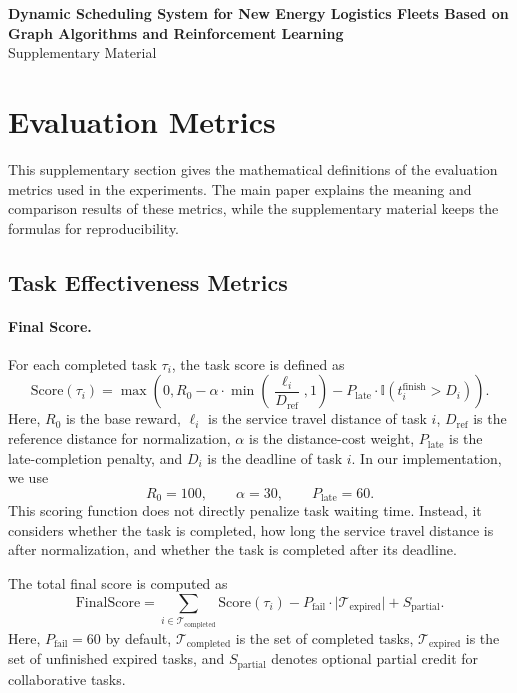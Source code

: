 \clearpage
\onecolumn
\setcounter{page}{1}
\begin{center}
{\Large\bfseries Dynamic Scheduling System for New Energy Logistics Fleets Based on Graph Algorithms and Reinforcement Learning\\[0.5em]}
{\large Supplementary Material}
\end{center}
\vspace{1em}

\section{Evaluation Metrics}
\label{sec:supp_eval_metrics}

This supplementary section gives the mathematical definitions of the evaluation metrics used in the experiments. The main paper explains the meaning and comparison results of these metrics, while the supplementary material keeps the formulas for reproducibility.

\subsection{Task Effectiveness Metrics}

\paragraph{Final Score.}
For each completed task \(\tau_i\), the task score is defined as
\[
\mathrm{Score}(\tau_i)=
\max
\left(
0,
R_0
-
\alpha \cdot
\min
\left(
\frac{\ell_i}{D_{\mathrm{ref}}},
1
\right)
-
P_{\mathrm{late}}\cdot
\mathbb{I}\left(t_i^{\mathrm{finish}}>D_i\right)
\right).
\]
Here, \(R_0\) is the base reward, \(\ell_i\) is the service travel distance of task \(i\), \(D_{\mathrm{ref}}\) is the reference distance for normalization, \(\alpha\) is the distance-cost weight, \(P_{\mathrm{late}}\) is the late-completion penalty, and \(D_i\) is the deadline of task \(i\). In our implementation, we use
\[
R_0=100,
\qquad
\alpha=30,
\qquad
P_{\mathrm{late}}=60.
\]
This scoring function does not directly penalize task waiting time. Instead, it considers whether the task is completed, how long the service travel distance is after normalization, and whether the task is completed after its deadline.

The total final score is computed as
\[
\mathrm{FinalScore}=
\sum_{i\in\mathcal{T}_{\mathrm{completed}}}
\mathrm{Score}(\tau_i)
-
P_{\mathrm{fail}}\cdot
\lvert\mathcal{T}_{\mathrm{expired}}\rvert
+
S_{\mathrm{partial}}.
\]
Here, \(P_{\mathrm{fail}}=60\) by default, \(\mathcal{T}_{\mathrm{completed}}\) is the set of completed tasks, \(\mathcal{T}_{\mathrm{expired}}\) is the set of unfinished expired tasks, and \(S_{\mathrm{partial}}\) denotes optional partial credit for collaborative tasks.

